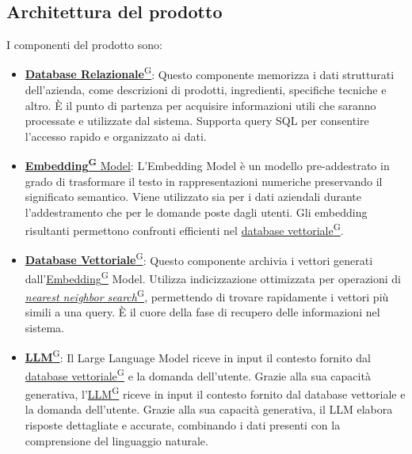 \subsection{Architettura del prodotto}
I componenti del prodotto sono:
\begin{itemize}
    \item \href{https://code7crusaders.github.io/docs/RTB/documentazione_interna/glossario.html#database-relazionale}{\textbf{Database Relazionale}\textsuperscript{G}}:  
    Questo componente memorizza i dati strutturati dell’azienda, come descrizioni di prodotti, ingredienti, specifiche tecniche e altro. È il punto di partenza per acquisire informazioni utili che saranno processate e utilizzate dal sistema. Supporta query SQL per consentire l'accesso rapido e organizzato ai dati.
    
    \item \href{https://code7crusaders.github.io/docs/RTB/documentazione_interna/glossario.html#embedding}{\textbf{Embedding\textsuperscript{G}} Model}:  
    L’Embedding Model è un modello pre-addestrato in grado di trasformare il testo in rappresentazioni numeriche preservando il significato semantico. Viene utilizzato sia per i dati aziendali durante l’addestramento che per le domande poste dagli utenti. Gli embedding risultanti permettono confronti efficienti nel \href{https://code7crusaders.github.io/docs/RTB/documentazione_interna/glossario.html#database-vettoriale}{database vettoriale\textsuperscript{G}}.
    
    \item \href{https://code7crusaders.github.io/docs/RTB/documentazione_interna/glossario.html#database-vettoriale}{\textbf{Database Vettoriale}\textsuperscript{G}}:  
    Questo componente archivia i vettori generati dall’\href{https://code7crusaders.github.io/docs/RTB/documentazione_interna/glossario.html#embedding}{Embedding\textsuperscript{G}} Model. Utilizza indicizzazione ottimizzata per operazioni di \href{https://code7crusaders.github.io/docs/RTB/documentazione_interna/glossario.html#nearest-neighbor-search-nns}{\textit{nearest neighbor search}\textsuperscript{G}}, permettendo di trovare rapidamente i vettori più simili a una query. È il cuore della fase di recupero delle informazioni nel sistema.
    
    \item \href{https://code7crusaders.github.io/docs/RTB/documentazione_interna/glossario.html#llm-large-language-model}{\textbf{LLM}\textsuperscript{G}}:  
    Il Large Language Model riceve in input il contesto fornito dal \href{https://code7crusaders.github.io/docs/RTB/documentazione_interna/glossario.html#database-vettoriale}{database vettoriale\textsuperscript{G}} e la domanda dell’utente. Grazie alla sua capacità generativa, l'\href{https://code7crusaders.github.io/docs/RTB/documentazione_interna/glossario.html#llm-large-language-model}{LLM\textsuperscript{G}} riceve in input il contesto fornito dal database vettoriale e la domanda dell’utente. Grazie alla sua capacità generativa, il LLM elabora risposte dettagliate e accurate, combinando i dati presenti con la comprensione del linguaggio naturale.
    

\end{itemize}
